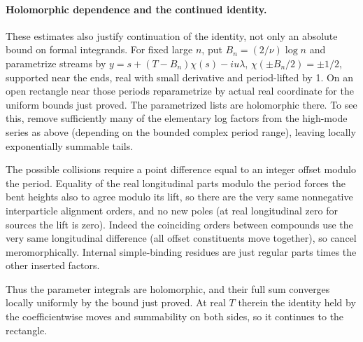 \paragraph{Holomorphic dependence and the continued identity.}
These estimates also justify continuation of the identity, not only an
absolute bound on formal integrands. For fixed large \(n\), put \(B_n=(2/\nu)\log n\) and parametrize streams by \(y=s+(T-B_n)\chi(s)-iu\lambda\), \(\chi(\pm B_n/2)=\pm1/2\), supported near the ends, real with small derivative and period-lifted by 1. On an open rectangle near those periods reparametrize by actual real coordinate for the uniform bounds just proved. The parametrized lists are holomorphic there. To see this, remove sufficiently many of the elementary log factors from the high-mode series as above (depending on the bounded complex period range), leaving locally exponentially summable tails. \par
The possible collisions require a point difference equal to an integer
offset modulo the period. Equality of the real longitudinal parts modulo the period forces the bent heights also to agree modulo its lift, so there are the very same nonnegative interparticle alignment orders, and no new poles (at real longitudinal zero for sources the lift is zero). Indeed the coinciding orders between compounds use the very same longitudinal difference (all offset constituents move together), so cancel meromorphically. Internal simple-binding residues are just regular parts times the other inserted factors. \par
Thus the parameter integrals are holomorphic, and their full sum
converges locally uniformly by the bound just proved. At real \(T\) therein the identity held by the coefficientwise moves and summability on both sides, so it continues to the rectangle.

